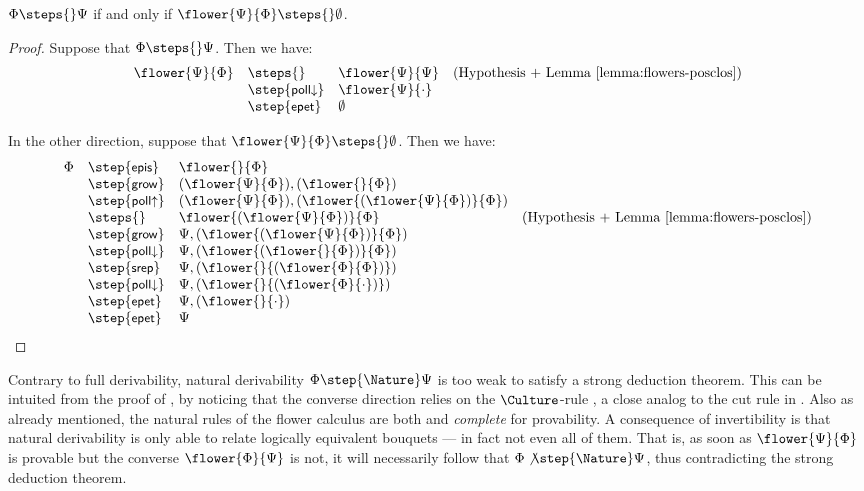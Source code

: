 \begin{theorem}
  $\Phi \steps{} \Psi$ if and only if $\flower{\Psi}{\Phi} \steps{} \emptyset$.
\end{theorem}
\begin{proof}
  Suppose that $\Phi \steps{} \Psi$. Then we have:
  $$
  \begin{array}{rlll}
    \flower{\Psi}{\Phi}
    &\steps{} &\flower{\Psi}{\Psi} &\text{(Hypothesis + \reflemma{flowers-posclos})}\\
    &\step{\rsf{poll{\da}}} &\flower{\Psi}{\cdot} &\\
    &\step{\rsf{epet}} &\emptyset &
  \end{array}
  $$
  
  In the other direction, suppose that $\flower{\Psi}{\Phi} \steps{} \emptyset$.
  Then we have:
  $$
  \begin{array}{rlll}
    \Phi
    &\step{\rsf{epis}} &\flower{}{\Phi} &\\
    &\step{\rsf{grow}} &(\flower{\Psi}{\Phi}),(\flower{}{\Phi}) &\\
    &\step{\rsf{poll{\ua}}} &(\flower{\Psi}{\Phi}),(\flower{(\flower{\Psi}{\Phi})}{\Phi}) &\\
    &\steps{} &\flower{(\flower{\Psi}{\Phi})}{\Phi} &\text{(Hypothesis + \reflemma{flowers-posclos})}\\
    &\step{\rsf{grow}} &\Psi,(\flower{(\flower{\Psi}{\Phi})}{\Phi}) &\\
    &\step{\rsf{poll{\da}}} &\Psi,(\flower{(\flower{}{\Phi})}{\Phi}) &\\
    &\step{\rsf{srep}} &\Psi,(\flower{}{(\flower{\Phi}{\Phi})}) &\\
    &\step{\rsf{poll{\da}}} &\Psi,(\flower{}{(\flower{\Phi}{\cdot})}) &\\
    &\step{\rsf{epet}} &\Psi,(\flower{}{\cdot}) &\\
    &\step{\rsf{epet}} &\Psi
  \end{array}
  $$
\end{proof}

Contrary to full derivability, natural derivability $\Phi \step{\Nature} \Psi$
is too weak to satisfy a strong deduction theorem. This can be intuited from the
proof of , by noticing that the converse
direction relies on the $\Culture$-rule , a close analog to the cut
rule in . Also as already mentioned, the natural rules of the
flower calculus are both \emph{} and \emph{complete} for provability.
A consequence of invertibility is that natural derivability is only able to
relate logically equivalent bouquets --- in fact not even all of them. That is,
as soon as $\flower{\Psi}{\Phi}$ is provable but the converse
$\flower{\Phi}{\Psi}$ is not, it will necessarily follow that $\Phi
\not\step{\Nature} \Psi$, thus contradicting the strong deduction theorem.

